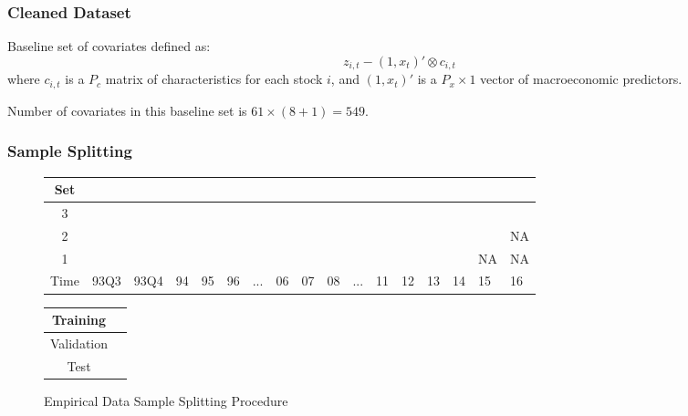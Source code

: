 \documentclass[aspectratio=169]{beamer}
\begin{document}
\begin{frame}
\frametitle{Cleaned Dataset}
Baseline set of covariates defined as:
\begin{equation}
	z_{i,t} - (1, x_t)' \otimes c_{i,t}
\end{equation}
where $c_{i,t}$ is a $P_c$ matrix of characteristics for each stock $i$, and $(1, x_t)'$ is a $P_x \times 1$ vector of macroeconomic predictors.

Number of covariates in this baseline set is $61 \times (8 + 1) = 549$. 
\end{frame}


\begin{frame}
\frametitle{Sample Splitting}
\begin{figure}
	\begin{center}
		\begin{tabular}{|c|p{0.60cm}p{0.60cm}p{0.40cm}p{0.40cm}p{0.40cm}p{0.40cm}p{0.40cm}p{0.40cm}p{0.40cm}p{0.40cm}p{0.40cm}p{0.40cm}p{0.40cm}p{0.40cm}p{0.40cm}p{0.40cm}|}
			\hline
			Set &&&&&&&&&&&&&&&& \\
			\hline
			3 & \cellcolor{cyan} & \cellcolor{cyan} & \cellcolor{cyan} & \cellcolor{cyan} & \cellcolor{cyan} & \cellcolor{cyan} & \cellcolor{cyan} & \cellcolor{cyan} &
			\cellcolor{pink} & \cellcolor{pink} & \cellcolor{pink} & \cellcolor{pink} & \cellcolor{pink} & \cellcolor{pink} & \cellcolor{pink} & \cellcolor{olive} \\
			2 & \cellcolor{cyan} & \cellcolor{cyan} & \cellcolor{cyan} & \cellcolor{cyan} & \cellcolor{cyan} & \cellcolor{cyan} & \cellcolor{cyan} &
			\cellcolor{pink} & \cellcolor{pink} & \cellcolor{pink} & \cellcolor{pink} & \cellcolor{pink} & \cellcolor{pink} & \cellcolor{pink} & 	
			\cellcolor{olive} & NA \\
			1 & \cellcolor{cyan} & \cellcolor{cyan} & \cellcolor{cyan} & \cellcolor{cyan} & \cellcolor{cyan} & \cellcolor{cyan} &
			\cellcolor{pink} & \cellcolor{pink} & \cellcolor{pink} & \cellcolor{pink} & \cellcolor{pink} & \cellcolor{pink} & \cellcolor{pink} & \cellcolor{olive} & NA & NA \\
			\hline
			Time & 93Q3 & 93Q4 & 94 & 95 & 96 & ... & 06 & 07 & 08 & ... & 11 & 12 & 13 & 14 & 15 & 16 \\
			\hline
		\end{tabular}
		\medskip
		\begin{tabular}{|c|p{0.60cm}|}
			\hline
			Training & \cellcolor{cyan} \\
			\hline
			Validation & \cellcolor{pink} \\
			\hline
			Test & \cellcolor{olive} \\
			\hline
		\end{tabular}
	\end{center}
	\caption{Empirical Data Sample Splitting Procedure}
	\label{emp_sample_split_diag}
\end{figure}
\end{frame}
\end{document}
